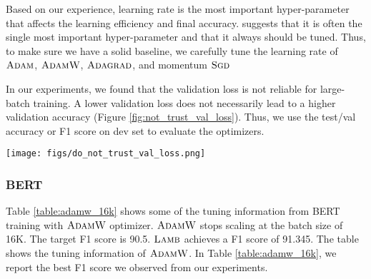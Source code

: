 \documentclass{article} \usepackage{iclr2020_conference,times}
\newcommand{\sgd}{\textsc{Sgd}\xspace}
\newcommand{\adagrad}{\textsc{Adagrad}}
\newcommand{\adam}{\textsc{Adam}}
\newcommand{\adamw}{\textsc{AdamW}}
\newcommand{\lamb}{\textsc{Lamb}}
\begin{document}
Based on our experience, learning rate is the most important hyper-parameter that affects the learning efficiency and final accuracy.
\cite{bengio2012practical} suggests that it is often the single most important hyper-parameter and that it always should be tuned.
Thus, to make sure we have a solid baseline, we carefully tune the learning rate of $\adam$, $\adamw$, $\adagrad$, and momentum $\sgd$

In our experiments, we found that the validation loss is not reliable for large-batch training. A lower validation loss does not necessarily lead to a higher validation accuracy (Figure \ref{fig:not_trust_val_loss}).
Thus, we use the test/val accuracy or F1 score on dev set to evaluate the optimizers.





\begin{figure*}[tb]
\vspace{5pt}
\centering
\texttt{[image: figs/do\_not\_trust\_val\_loss.png]}
\caption{Our experiments show that even the validation loss is not reliable in the large-scale training. A lower validation loss may lead to a worse accuracy. Thus, we use the test/val accuracy or F1 score on dev set to evaluate the optimizers.}
\label{fig:not_trust_val_loss}
\vspace{-10pt}
\end{figure*}



\subsubsection{BERT}
Table \ref{table:adamw_16k} shows some of the tuning information from BERT training with $\adamw$ optimizer.
$\adamw$ stops scaling at the batch size of 16K. The target F1 score is 90.5. $\lamb$ achieves a F1 score of 91.345. The table shows the tuning information of $\adamw$. In Table \ref{table:adamw_16k}, we report the best F1 score we observed from our experiments.
\end{document}
